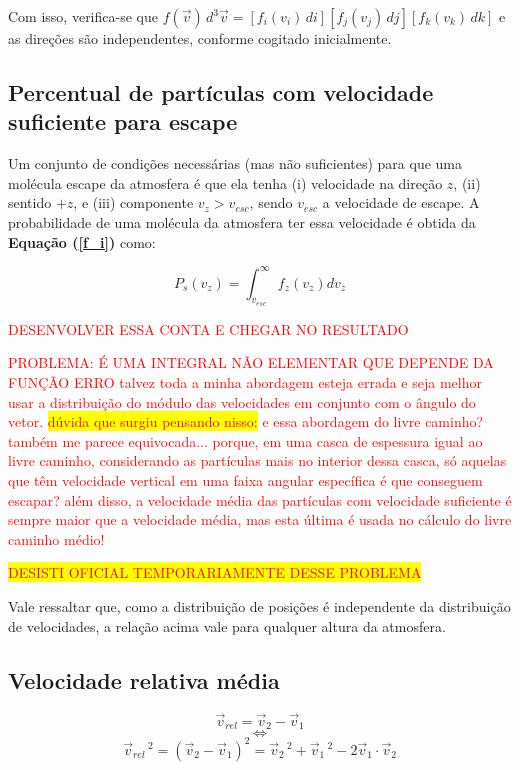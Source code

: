 \documentclass[12pt]{extarticle} %
\begin{document}
Com isso, verifica-se que $f(\vec{v})\, d^3\vec{v} = \left[f_i(v_i)\, di\right] \left[f_j(v_j)\, dj \right]\left[f_k(v_k)\, dk\right]$ e as direções são independentes, conforme cogitado inicialmente.



\subsection{Percentual de partículas com velocidade suficiente para escape}

Um conjunto de condições necessárias (mas não suficientes) para que uma molécula escape da atmosfera é que ela tenha (i) velocidade na direção $z$, (ii) sentido $+z$, e (iii) componente $v_z > v_{esc}$, sendo $v_{esc}$ a velocidade de escape. A probabilidade de uma molécula da atmosfera ter essa velocidade é obtida da \textbf{Equação (\ref{f_i})} como:

$$P_s(v_z) = \int_{v_{esc}}^{\infty} f_z(v_z)dv_z$$

\textcolor{red}{DESENVOLVER ESSA CONTA E CHEGAR NO RESULTADO}

\textcolor{red}{PROBLEMA: É UMA INTEGRAL NÃO ELEMENTAR QUE DEPENDE DA FUNÇÃO ERRO}
\textcolor{red}{talvez toda a minha abordagem esteja errada e seja melhor usar a distribuição do módulo das velocidades em conjunto com o ângulo do vetor.}
\colorbox{yellow}{\textcolor{red}{dúvida que surgiu pensando nisso:}}
\textcolor{red}{e essa abordagem do livre caminho? também me parece equivocada... porque, em uma casca de espessura igual ao livre caminho, considerando as partículas mais no interior dessa casca, só aquelas que têm velocidade vertical em uma faixa angular específica é que conseguem escapar?}
\textcolor{red}{além disso, a velocidade média das partículas com velocidade suficiente é sempre maior que a velocidade média, mas esta última é usada no cálculo do livre caminho médio!}

\colorbox{yellow}{\textcolor{red}{DESISTI OFICIAL TEMPORARIAMENTE DESSE PROBLEMA}}

Vale ressaltar que, como a distribuição de posições é independente da distribuição de velocidades, a relação acima vale para qualquer altura da atmosfera.



\subsection{Velocidade relativa média}

$$\vec{v}_{rel} = \vec{v}_2 - \vec{v}_1$$
$$\Leftrightarrow$$
$$\vec{v}_{rel}\,^2 = (\vec{v}_2 - \vec{v}_1)^2 = \vec{v}_2\,^2+\vec{v}_1\,^2 - 2\vec{v}_1\cdot\vec{v}_2$$
\end{document}

